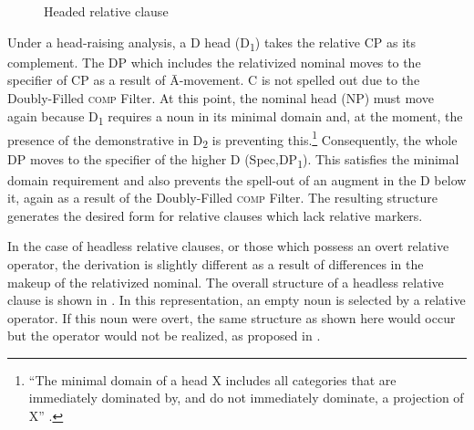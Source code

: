 \documentclass[output=paper,colorlinks,citecolor=brown
]{langscibook}
\begin{document}
\begin{figure}
\caption{Headed relative clause}
  \label{fig:myers:headed}
\end{figure}

Under a head-raising analysis, a D head (D\textsubscript{1}) takes the relative CP as its complement. The DP which includes the relativized nominal moves to the specifier of CP as a result of Ā-movement. C is not spelled out due to the Doubly-Filled \textsc{comp} Filter. At this point, the nominal head (NP) must move again because D\textsubscript{1} requires a noun in its minimal domain \citep{Bianchi:2000} and, at the moment, the presence of the demonstrative in D\textsubscript{2} is preventing this.\footnote{``The minimal domain of a head X includes all categories that are immediately dominated by, and do not immediately dominate, a projection of X'' \citep[128]{Bianchi:2000}.} Consequently, the whole DP moves to the specifier of the higher D (Spec,DP\textsubscript{1}). This satisfies the minimal domain requirement and also prevents the spell-out of an augment in the D below it, again as a result of the Doubly-Filled \textsc{comp} Filter. The resulting structure generates the desired form for relative clauses which lack relative markers.


In the case of headless relative clauses, or those which possess an overt relative operator, the derivation is slightly different as a result of differences in the makeup of the relativized nominal. The overall structure of a headless relative clause is shown in . In this representation, an empty noun is selected by a relative operator. If this noun were overt, the same structure as shown here would occur but the operator would not be realized, as proposed in .
\end{document}
